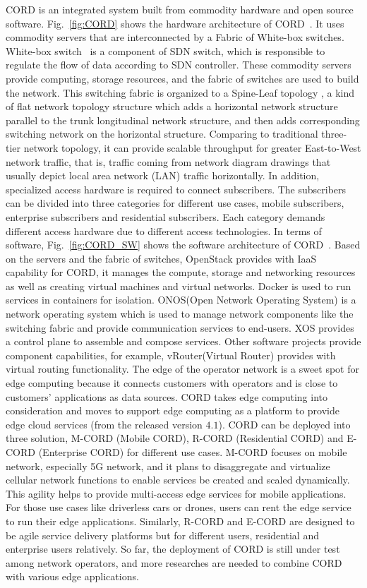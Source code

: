 CORD is an integrated system built from commodity hardware and open source software. Fig.~\ref{fig:CORD} shows the hardware architecture of CORD~. It uses commodity servers that are interconnected by a Fabric of White-box switches. White-box switch~ is  a  component of SDN switch, which is responsible to regulate the flow of data according to SDN controller. These commodity servers provide computing, storage resources, and the fabric of switches are used to build the network. This switching fabric is organized to a Spine-Leaf topology , a kind of flat network topology structure which adds a horizontal network structure parallel to the trunk longitudinal network structure, and then adds corresponding switching network on the horizontal structure. Comparing to traditional three-tier network topology, it can provide scalable throughput for greater East-to-West network traffic, that is, traffic coming from network diagram drawings that usually depict local area network (LAN) traffic horizontally. In addition, specialized access hardware is required to connect subscribers. The subscribers can be divided into three categories for different use cases, mobile subscribers, enterprise subscribers and residential subscribers. Each category demands different access hardware due to different access technologies. In terms of software, Fig.~\ref{fig:CORD_SW} shows the software architecture of CORD~. Based on the servers and the fabric of switches, OpenStack provides with IaaS capability for CORD, it manages the compute, storage and networking resources as well as creating virtual machines and virtual networks. Docker is used to run services in containers for isolation. ONOS(Open Network Operating System) is a network operating system which is used to manage network components like the switching fabric and provide communication services to end-users. XOS provides a control plane to assemble and compose services. Other software projects provide component capabilities, for example, vRouter(Virtual Router) provides with virtual routing functionality.
The edge of the operator network is a sweet spot for edge computing because it connects customers with operators and is close to customers' applications as data sources. CORD takes edge computing into consideration and moves to support edge computing as a platform to provide edge cloud services (from the released version $4.1$). CORD can be deployed into three solution, M-CORD (Mobile CORD), R-CORD (Residential CORD) and E-CORD (Enterprise CORD) for different use cases. M-CORD focuses on mobile network, especially 5G network, and it plans to disaggregate and virtualize cellular network functions to enable services be created and scaled dynamically. This agility helps to provide multi-access edge services for mobile applications. For those use cases like driverless cars or drones, users can rent the edge service to run their edge applications. Similarly, R-CORD and E-CORD are designed to be agile service delivery platforms but for different users, residential and enterprise users relatively. 
So far, the deployment of CORD is still under test among network operators, and more researches are needed to combine CORD with various edge applications.

